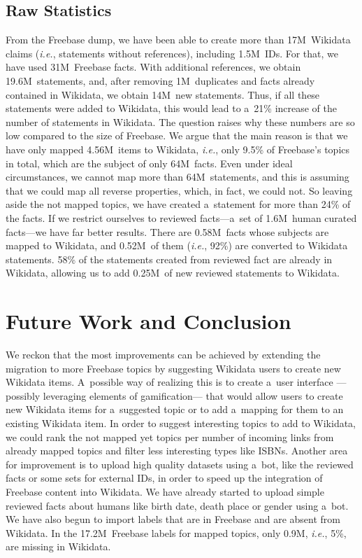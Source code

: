 \documentclass{acm_proc_article-sp}
\begin{document}
\subsection{Raw Statistics}

From the Freebase dump, we have been able to create more than 17M~Wikidata claims
(\emph{i.e.}, statements without references), including 1.5M~IDs.
For that, we have used 31M~Freebase facts.
With additional references, we obtain 19.6M~statements, and, after removing 1M~duplicates
and facts already contained in Wikidata, we obtain 14M~new statements.
Thus, if all these statements were added to Wikidata,
this would lead to a~21\% increase of the number of statements in Wikidata.
The question raises why these numbers are so low compared to the size of Freebase.
We argue that the main reason is that we have only mapped 4.56M~items to Wikidata,
\emph{i.e.}, only 9.5\% of Freebase's topics in total, which are the subject of only 64M~facts.
Even under ideal circumstances, we cannot map more than 64M~statements,
and this is assuming that we could map all reverse properties, which, in fact, we could not.
So leaving aside the not mapped topics, we have created a~statement for more than 24\% of the facts.
If we restrict ourselves to reviewed facts---a~set of 1.6M~human curated facts---we have far better results.
There are 0.58M~facts whose subjects are mapped to Wikidata, and 0.52M~of them
(\emph{i.e.}, 92\%) are converted to Wikidata statements.
58\% of the statements created from reviewed fact are already in Wikidata,
allowing us to add 0.25M~of new reviewed statements to Wikidata.

\section{Future Work and Conclusion}\label{sec:future-work-and-conclusion}

We reckon that the most improvements can be achieved
by extending the migration to more Freebase topics
by suggesting Wikidata users to create new Wikidata items.
A~possible way of realizing this is to create a~user interface%
---possibly leveraging elements of gamification---%
that would allow users to create new Wikidata items for a~suggested topic
or to add a~mapping for them to an existing Wikidata item.
In order to suggest interesting topics to add to Wikidata,
we could rank the not mapped yet topics per number of incoming links
from already mapped topics and filter less interesting types like ISBNs.
Another area for improvement is to upload high quality datasets using a~bot,
like the reviewed facts or some sets for external IDs,
in order to speed up the integration of Freebase content into Wikidata.
We have already started to upload simple reviewed facts about humans
like birth date, death place or gender using a~bot.
We have also begun to import labels that are in Freebase and are absent from Wikidata.
In the 17.2M~Freebase labels for mapped topics, only 0.9M, \emph{i.e.}, 5\%, are missing in Wikidata.
\end{document}
